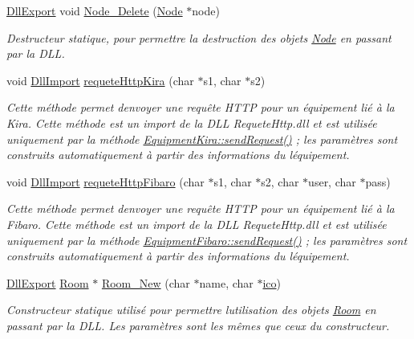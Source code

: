 \begin{DoxyCompactItemize}
\hyperlink{_room_8h_af83a0ad9d707a0bc5fe281b6e5c358a1}{Dll\+Export} void \hyperlink{namespace_e_p_ad5a5c7aef69e7b3664ea88ceca6474ae}{Node\+\_\+\+Delete} (\hyperlink{class_e_p_1_1_node}{Node} $\ast$node)
\begin{DoxyCompactList}\small\item\em Destructeur statique, pour permettre la destruction des objets \hyperlink{class_e_p_1_1_node}{Node} en passant par la D\+LL. \end{DoxyCompactList}\item 
void \hyperlink{_requete_http_8h_a3432717bdefebf74b3c408f8169a2274}{Dll\+Import} \hyperlink{namespace_e_p_aa7c44cc535092b61686502f6c790578f}{requete\+Http\+Kira} (char $\ast$s1, char $\ast$s2)
\begin{DoxyCompactList}\small\item\em Cette méthode permet d\textquotesingle{}envoyer une requête H\+T\+TP pour un équipement lié à la Kira. Cette méthode est un import de la D\+LL Requete\+Http.\+dll et est utilisée uniquement par la méthode \hyperlink{class_e_p_1_1_equipment_kira_ad59c93de1b98996ec273c5638cd7e47a}{Equipment\+Kira\+::send\+Request()} ; les paramètres sont construits automatiquement à partir des informations du l\textquotesingle{}équipement. \end{DoxyCompactList}\item 
void \hyperlink{_requete_http_8h_a3432717bdefebf74b3c408f8169a2274}{Dll\+Import} \hyperlink{namespace_e_p_ab887ba764b90de0284f1a84599772be6}{requete\+Http\+Fibaro} (char $\ast$s1, char $\ast$s2, char $\ast$user, char $\ast$pass)
\begin{DoxyCompactList}\small\item\em Cette méthode permet d\textquotesingle{}envoyer une requête H\+T\+TP pour un équipement lié à la Fibaro. Cette méthode est un import de la D\+LL Requete\+Http.\+dll et est utilisée uniquement par la méthode \hyperlink{class_e_p_1_1_equipment_fibaro_aff3a8468127e7915e1757d8b9b600587}{Equipment\+Fibaro\+::send\+Request()} ; les paramètres sont construits automatiquement à partir des informations du l\textquotesingle{}équipement. \end{DoxyCompactList}\item 
\hyperlink{_room_8h_af83a0ad9d707a0bc5fe281b6e5c358a1}{Dll\+Export} \hyperlink{class_e_p_1_1_room}{Room} $\ast$ \hyperlink{namespace_e_p_a6c71df3332887f6ad06b51555c7c8e65}{Room\+\_\+\+New} (char $\ast$name, char $\ast$\hyperlink{namespace_e_p_a9bb18717237cbb94269e26c77cc04b05}{ico})
\begin{DoxyCompactList}\small\item\em Constructeur statique utilisé pour permettre l\textquotesingle{}utilisation des objets \hyperlink{class_e_p_1_1_room}{Room} en passant par la D\+LL. Les paramètres sont les mêmes que ceux du constructeur. \end{DoxyCompactList}\item 

\end{DoxyCompactItemize}
